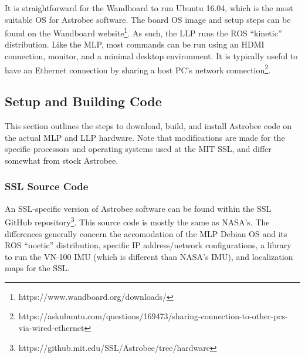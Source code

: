 \documentclass{article}
\begin{document}
It is straightforward for the Wandboard to run Ubuntu 16.04, which is the most suitable OS for Astrobee software. The board OS image and setup steps can be found on the Wandboard website\footnote{https://www.wandboard.org/downloads/}. As such, the LLP runs the ROS ``kinetic'' distribution. Like the MLP, most commands can be run using an HDMI connection, monitor, and a minimal desktop environment. It is typically useful to have an Ethernet connection by sharing a host PC's network connection\footnote{https://askubuntu.com/questions/169473/sharing-connection-to-other-pcs-via-wired-ethernet}.

\subsection{Setup and Building Code}
This section outlines the steps to download, build, and install Astrobee code on the actual MLP and LLP hardware. Note that modifications are made for the specific processors and operating systems used at the MIT SSL, and differ somewhat from stock Astrobee.

\subsubsection{SSL Source Code}
An SSL-specific version of Astrobee software can be found within the SSL GitHub repository\footnote{https://github.mit.edu/SSL/Astrobee/tree/hardware}. This source code is mostly the same as NASA's. The differences generally concern the accomodation of the MLP Debian OS and its ROS ``noetic'' distribution, specific IP address/network configurations, a library to run the VN-100 IMU (which is different than NASA's IMU), and localization maps for the SSL. 
\end{document}
